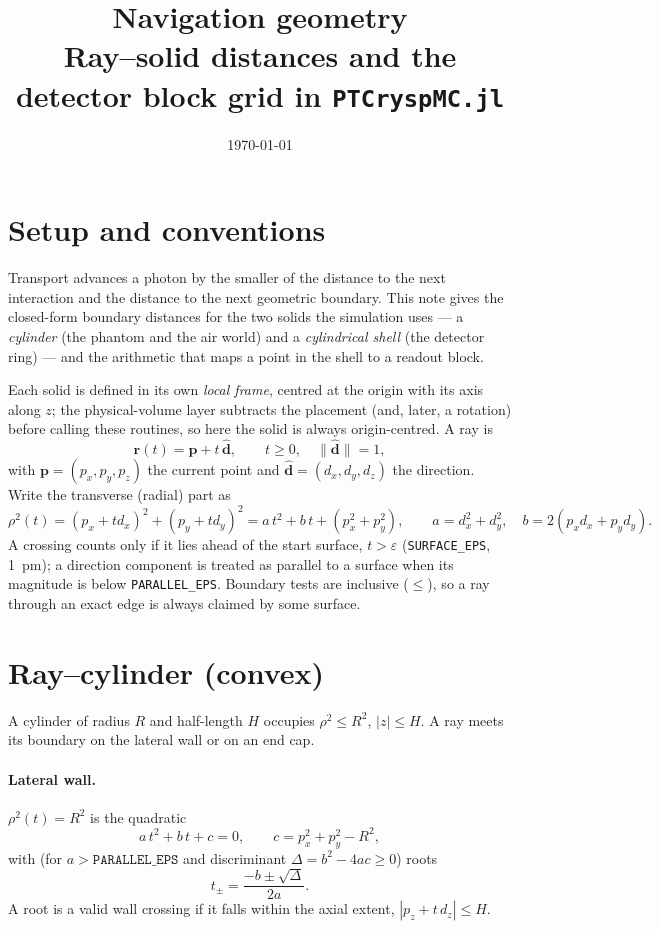 \documentclass[11pt]{article}
\title{Navigation geometry\\
\large Ray--solid distances and the detector block grid in \texttt{PTCryspMC.jl}}
\author{}
\date{\today}
\newcommand{\dvec}{\hat{\mathbf{d}}}
\begin{document}
\maketitle

\section{Setup and conventions}
\label{sec:setup}

Transport advances a photon by the smaller of the distance to the next interaction
and the distance to the next geometric boundary. This note gives the closed-form
boundary distances for the two solids the simulation uses --- a \emph{cylinder}
(the phantom and the air world) and a \emph{cylindrical shell} (the detector ring)
--- and the arithmetic that maps a point in the shell to a readout block.

Each solid is defined in its own \emph{local frame}, centred at the origin with its
axis along $z$; the physical-volume layer subtracts the placement (and, later, a
rotation) before calling these routines, so here the solid is always origin-centred.
A ray is
\begin{equation}
  \mathbf{r}(t) = \mathbf{p} + t\,\dvec, \qquad t \ge 0,\quad \|\dvec\| = 1 ,
\end{equation}
with $\mathbf{p}=(p_x,p_y,p_z)$ the current point and $\dvec=(d_x,d_y,d_z)$ the
direction. Write the transverse (radial) part as
\begin{equation}
  \rho^2(t) = (p_x + t d_x)^2 + (p_y + t d_y)^2 = a\,t^2 + b\,t + (p_x^2 + p_y^2),
  \qquad a = d_x^2 + d_y^2,\quad b = 2(p_x d_x + p_y d_y).
\end{equation}
A crossing counts only if it lies ahead of the start surface, $t > \varepsilon$
(\texttt{SURFACE\_EPS}, \SI{1}{pm}); a direction component is treated as parallel to
a surface when its magnitude is below \texttt{PARALLEL\_EPS}. Boundary tests are
inclusive ($\le$), so a ray through an exact edge is always claimed by some surface.

\section{Ray--cylinder (convex)}
\label{sec:cyl}

A cylinder of radius $R$ and half-length $H$ occupies $\rho^2 \le R^2$, $|z|\le H$.
A ray meets its boundary on the lateral wall or on an end cap.

\paragraph{Lateral wall.} $\rho^2(t)=R^2$ is the quadratic
\begin{equation}
  a\,t^2 + b\,t + c = 0, \qquad c = p_x^2 + p_y^2 - R^2 ,
\end{equation}
with (for $a>\texttt{PARALLEL\_EPS}$ and discriminant $\Delta=b^2-4ac\ge 0$) roots
\begin{equation}
  t_\pm = \frac{-b \pm \sqrt{\Delta}}{2a}.
\end{equation}
A root is a valid wall crossing if it falls within the axial extent,
$|p_z + t\,d_z| \le H$.
\end{document}
